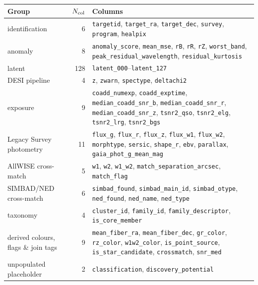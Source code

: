 \begin{ruledtabular}
\begin{tabular}{l r p{}}
Group & $N_{\rm col}$ & Columns \\
\hline
identification & 6 & \texttt{targetid}, \texttt{target\_ra}, \texttt{target\_dec}, \texttt{survey}, \texttt{program}, \texttt{healpix} \\
anomaly & 8 & \texttt{anomaly\_score}, \texttt{mean\_mse}, \texttt{rB}, \texttt{rR}, \texttt{rZ}, \texttt{worst\_band}, \texttt{peak\_residual\_wavelength}, \texttt{residual\_kurtosis} \\
latent & 128 & \texttt{latent\_000}--\texttt{latent\_127} \\
DESI pipeline & 4 & \texttt{z}, \texttt{zwarn}, \texttt{spectype}, \texttt{deltachi2} \\
exposure & 9 & \texttt{coadd\_numexp}, \texttt{coadd\_exptime}, \texttt{median\_coadd\_snr\_b}, \texttt{median\_coadd\_snr\_r}, \texttt{median\_coadd\_snr\_z}, \texttt{tsnr2\_qso}, \texttt{tsnr2\_elg}, \texttt{tsnr2\_lrg}, \texttt{tsnr2\_bgs} \\
Legacy Survey photometry & 11 & \texttt{flux\_g}, \texttt{flux\_r}, \texttt{flux\_z}, \texttt{flux\_w1}, \texttt{flux\_w2}, \texttt{morphtype}, \texttt{sersic}, \texttt{shape\_r}, \texttt{ebv}, \texttt{parallax}, \texttt{gaia\_phot\_g\_mean\_mag} \\
AllWISE cross-match & 5 & \texttt{w1}, \texttt{w2}, \texttt{w1\_w2}, \texttt{match\_separation\_arcsec}, \texttt{match\_flag} \\
SIMBAD/NED cross-match & 6 & \texttt{simbad\_found}, \texttt{simbad\_main\_id}, \texttt{simbad\_otype}, \texttt{ned\_found}, \texttt{ned\_name}, \texttt{ned\_type} \\
taxonomy & 4 & \texttt{cluster\_id}, \texttt{family\_id}, \texttt{family\_descriptor}, \texttt{is\_core\_member} \\
derived colours, flags \& join tags & 9 & \texttt{mean\_fiber\_ra}, \texttt{mean\_fiber\_dec}, \texttt{gr\_color}, \texttt{rz\_color}, \texttt{w1w2\_color}, \texttt{is\_point\_source}, \texttt{is\_star\_candidate}, \texttt{crossmatch}, \texttt{snr\_med} \\
unpopulated placeholder & 2 & \texttt{classification}, \texttt{discovery\_potential} \\
\end{tabular}
\end{ruledtabular}
